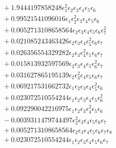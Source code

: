 \documentclass[10pt]{article}
\begin{document}
\begin{align*}
&{}  + 1.9444197858248 \epsilon_{1}^{2} \epsilon_{2} \epsilon_{3} \epsilon_{4} \epsilon_{5} \epsilon_{6} \\
&{}  + 0.99521541096016 \epsilon_{1} \epsilon_{2}^{2} \epsilon_{3} \epsilon_{4} \epsilon_{5} \epsilon_{6} \\
&{}  + 0.0052713108658564 \epsilon_{2} \epsilon_{3} \epsilon_{4} \epsilon_{5} \epsilon_{6} \epsilon_{7}^{2} \\
&{}  + 0.021085243463426 \epsilon_{2} \epsilon_{3} \epsilon_{4} \epsilon_{5}^{2} \epsilon_{6} \epsilon_{7} \\
&{}  + 0.026356554329282 \epsilon_{2} \epsilon_{3} \epsilon_{4}^{2} \epsilon_{5} \epsilon_{6} \epsilon_{7} \\
&{}  + 0.015813932597569 \epsilon_{2} \epsilon_{3} \epsilon_{4} \epsilon_{5} \epsilon_{6}^{2} \epsilon_{7} \\
&{}  + 0.031627865195139 \epsilon_{2} \epsilon_{3}^{2} \epsilon_{4} \epsilon_{5} \epsilon_{6} \epsilon_{7} \\
&{}  + 0.069217531662732 \epsilon_{1} \epsilon_{2} \epsilon_{3} \epsilon_{4} \epsilon_{5}^{2} \epsilon_{6} \\
&{}  + 0.023072510554244 \epsilon_{1} \epsilon_{2} \epsilon_{3} \epsilon_{4} \epsilon_{5} \epsilon_{6}^{2} \\
&{}  + 0.092290042216975 \epsilon_{1} \epsilon_{2} \epsilon_{3} \epsilon_{4}^{2} \epsilon_{5} \epsilon_{6} \\
&{}  - 0.0039311479744497 \epsilon_{2}^{2} \epsilon_{3} \epsilon_{4} \epsilon_{5} \epsilon_{6} \epsilon_{7} \\
&{}  + 0.0052713108658564 \epsilon_{2} \epsilon_{3} \epsilon_{4} \epsilon_{5} \epsilon_{6} \epsilon_{7} \epsilon_{8} \\
&{}  + 0.023072510554244 \epsilon_{1} \epsilon_{2} \epsilon_{3} \epsilon_{4} \epsilon_{5} \epsilon_{6} \epsilon_{7}
\end{align*}
\end{document}

